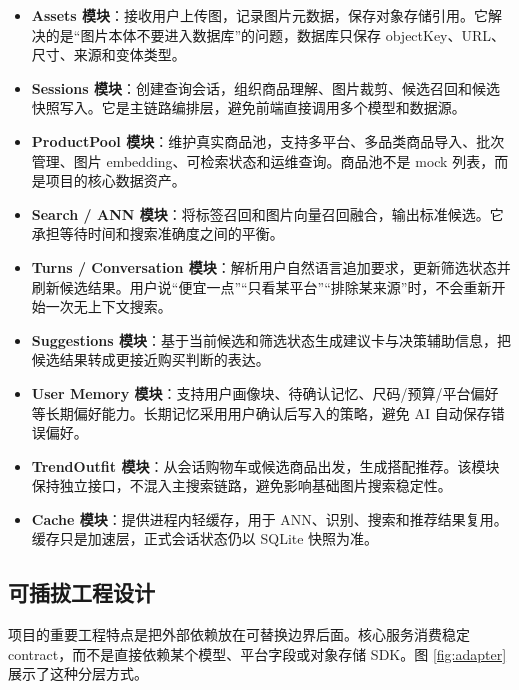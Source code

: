 \documentclass[UTF8,a4paper,zihao=-4]{ctexart}
\begin{document}
\begin{itemize}
  \item \textbf{Assets 模块}：接收用户上传图，记录图片元数据，保存对象存储引用。它解决的是“图片本体不要进入数据库”的问题，数据库只保存 objectKey、URL、尺寸、来源和变体类型。
  \item \textbf{Sessions 模块}：创建查询会话，组织商品理解、图片裁剪、候选召回和候选快照写入。它是主链路编排层，避免前端直接调用多个模型和数据源。
  \item \textbf{ProductPool 模块}：维护真实商品池，支持多平台、多品类商品导入、批次管理、图片 embedding、可检索状态和运维查询。商品池不是 mock 列表，而是项目的核心数据资产。
  \item \textbf{Search / ANN 模块}：将标签召回和图片向量召回融合，输出标准候选。它承担等待时间和搜索准确度之间的平衡。
  \item \textbf{Turns / Conversation 模块}：解析用户自然语言追加要求，更新筛选状态并刷新候选结果。用户说“便宜一点”“只看某平台”“排除某来源”时，不会重新开始一次无上下文搜索。
  \item \textbf{Suggestions 模块}：基于当前候选和筛选状态生成建议卡与决策辅助信息，把候选结果转成更接近购买判断的表达。
  \item \textbf{User Memory 模块}：支持用户画像块、待确认记忆、尺码/预算/平台偏好等长期偏好能力。长期记忆采用用户确认后写入的策略，避免 AI 自动保存错误偏好。
  \item \textbf{TrendOutfit 模块}：从会话购物车或候选商品出发，生成搭配推荐。该模块保持独立接口，不混入主搜索链路，避免影响基础图片搜索稳定性。
  \item \textbf{Cache 模块}：提供进程内轻缓存，用于 ANN、识别、搜索和推荐结果复用。缓存只是加速层，正式会话状态仍以 SQLite 快照为准。
\end{itemize}

\subsection{可插拔工程设计}

项目的重要工程特点是把外部依赖放在可替换边界后面。核心服务消费稳定 contract，而不是直接依赖某个模型、平台字段或对象存储 SDK。图 \ref{fig:adapter} 展示了这种分层方式。
\end{document}
